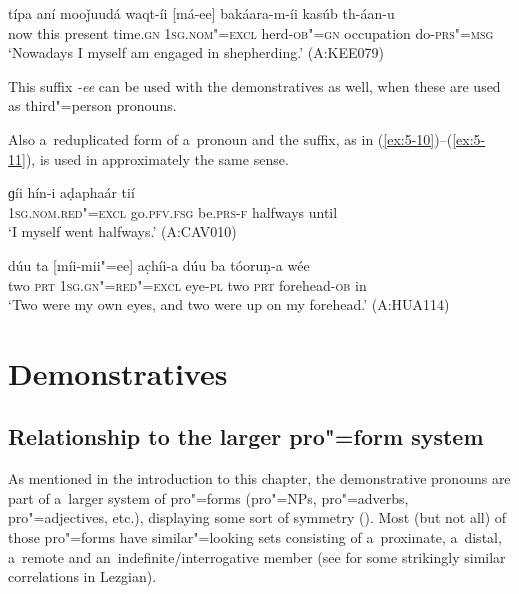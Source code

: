 \begin{exe}
\ex
\label{ex:5-9}
\gll típa aní mooǰuudá waqt-íi [má-ee] bakáara-m-íi kasúb th-áan-u \\
	now this present time.\textsc{gn} \textsc{1sg.nom"=excl} herd-\textsc{ob"=gn} occupation do-\textsc{prs"=msg} \\
\glt `Nowadays I myself am engaged in shepherding.' (A:KEE079)
\end{exe}

This suffix \textit{-ee} can be used with the demonstratives as well, when these are used as third"=person pronouns. 

Also a~reduplicated form of a~pronoun and the suffix, as in (\ref{ex:5-10})--(\ref{ex:5-11}), is used in approximately the same sense.


\begin{exe}
\ex
\label{ex:5-10}
\gll [mám-ee] ɡíi hín-i aḍaphaár tií\\
	\textsc{1sg.nom.red"=excl} go.\textsc{pfv.fsg} be.\textsc{prs-f} halfways until \\
\glt `I myself went halfways.' (A:CAV010)

\ex
\label{ex:5-11}
\gll dúu ta [míi-mii"=ee] ac̣híi-a dúu ba tóoruṇ-a wée \\
	two \textsc{prt} \textsc{1sg.gn"=red"=excl} eye-\textsc{pl} two \textsc{prt} forehead-\textsc{ob} in \\
\glt `Two were my own eyes, and two were up on my forehead.' (A:HUA114) 
\end{exe}

\section{Demonstratives}
\label{sec:5-3}

\subsection{Relationship to the larger pro"=form system}
\label{subsec:5-2-1}


As mentioned in the introduction to this chapter, the demonstrative pronouns are part of a~larger system of pro"=forms (pro"=NPs, pro"=adverbs, pro"=adjectives, etc.), displaying some sort of symmetry (). Most (but not all) of those pro"=forms have similar"=looking sets consisting of a~proximate, a~distal, a~remote and an~indefinite/interrogative member (see \citealt[187--188]{haspelmath1993} for some strikingly similar correlations in Lezgian).



